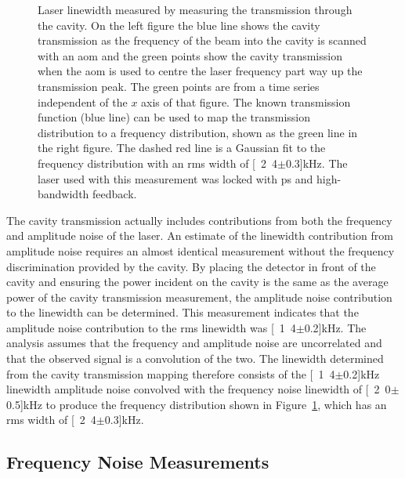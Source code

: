 \begin{figure}
\center

\caption[Laser linewidth measured by examining cavity transmission on one side of the cavity transmission peak.]{Laser linewidth measured by measuring the transmission through the cavity. On the left figure the blue line shows the cavity transmission as the frequency of the beam into the cavity is scanned with an \gls{aom} and the green points show the cavity transmission when the \gls{aom} is used to centre the laser frequency part way up the transmission peak.
The green points are from a time series independent of the $x$ axis of that figure.
The known transmission function (blue line) can be used to map the transmission distribution to a frequency distribution, shown as the green line in the right figure.
The dashed red line is a Gaussian fit to the frequency distribution with an \gls{rms} width of \unit[2.4$\pm$0.3]{kHz}.
The laser used with this measurement was locked with \gls{ps} and high-bandwidth feedback.}
\label{figure:side_of_peak}
\end{figure}

The cavity transmission actually includes contributions from both the frequency and amplitude noise of the laser.
An estimate of the linewidth contribution from amplitude noise requires an almost identical measurement without the frequency discrimination provided by the cavity.
By placing the detector in front of the cavity and ensuring the power incident on the cavity is the same as the average power of the cavity transmission measurement, the amplitude noise contribution to the linewidth can be determined.
This measurement indicates that the amplitude noise contribution to the \gls{rms} linewidth was \unit[1.4$\pm$0.2]{kHz}.
The analysis assumes that the frequency and amplitude noise are uncorrelated and that the observed signal is a convolution of the two.
The linewidth determined from the cavity transmission mapping therefore consists of the \unit[1.4$\pm$0.2]{kHz} linewidth amplitude noise convolved with the frequency noise linewidth of \unit[2.0$\pm$0.5]{kHz} to produce the frequency distribution shown in Figure~\ref{figure:side_of_peak}, which has an \gls{rms} width of \unit[2.4$\pm$0.3]{kHz}.

\subsection{Frequency Noise Measurements}

